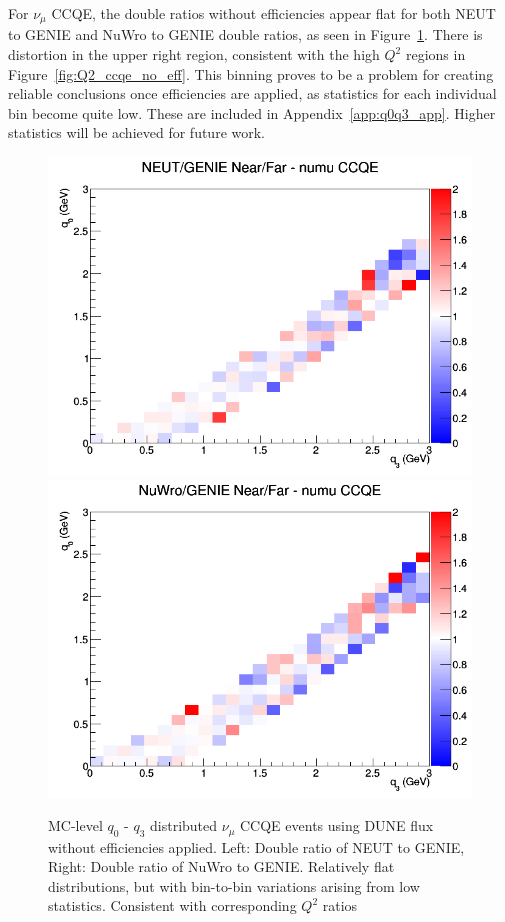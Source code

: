 \documentclass[12pt]{article}
\begin{document}
For $\nu_{\mu}$ CCQE, the double ratios without efficiencies appear flat for both NEUT to GENIE and NuWro to GENIE double ratios, as seen in Figure~\ref{fig:q0q3_numu_CCQE_no_eff}. There is distortion in the upper right region, consistent with the high $Q^2$ regions in Figure~\ref{fig:Q2_ccqe_no_eff}.  This binning proves to be a problem for creating reliable conclusions once efficiencies are applied, as statistics for each individual bin become quite low. These are included in Appendix~\ref{app:q0q3_app}. Higher statistics will be achieved for future work.
\begin{figure}[h]
\centering
{}
\includegraphics[width=\linewidth]{q0_q3/nominal/ratios/CCQE_NEUT_GENIE_numu_NF_q3_q0.png}
\endminipage
{}
\includegraphics[width=\linewidth]{q0_q3/nominal/ratios/CCQE_NuWro_GENIE_numu_NF_q3_q0.png}
\endminipage
\caption{MC-level $q_0 \textrm{ - } q_3$ distributed $\nu_{\mu}$ CCQE events using DUNE flux without efficiencies applied. Left: Double ratio of NEUT to GENIE, Right: Double ratio of NuWro to GENIE. Relatively flat distributions, but with bin-to-bin variations arising from low statistics. Consistent with corresponding $Q^2$ ratios} 
\label{fig:q0q3_numu_CCQE_no_eff}
\end{figure}
\FloatBarrier
\end{document}
